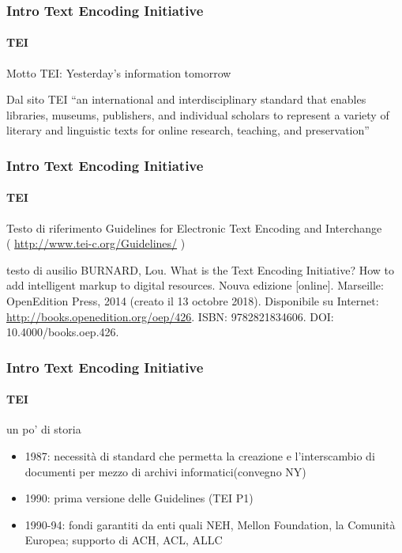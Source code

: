 

\begin{frame}
	\frametitle{Intro Text Encoding Initiative}
	\framesubtitle{TEI}
	\addtocounter{nframe}{1}

	\begin{block}{Motto}
		TEI: Yesterday's information tomorrow
	\end{block}

	\begin{block}{Dal sito TEI}
		“an international and interdisciplinary standard that
		enables libraries, museums, publishers, and individual
		scholars to represent a variety of literary and linguistic
		texts for online research, teaching, and preservation”
	\end{block}
\end{frame}


\begin{frame}
	\frametitle{Intro Text Encoding Initiative}
	\framesubtitle{TEI}
	\addtocounter{nframe}{1}

	\begin{block}{Testo di riferimento}
        Guidelines for Electronic Text Encoding and Interchange 
        \\( \url{http://www.tei-c.org/Guidelines/} )
	\end{block}

	\begin{block}{testo di ausilio}
		BURNARD, Lou. What is the Text Encoding Initiative? How to add intelligent markup to digital resources. Nouva edizione [online]. Marseille: OpenEdition Press, 2014 (creato il 13 octobre 2018). Disponibile su Internet: \url{http://books.openedition.org/oep/426}. ISBN: 9782821834606. DOI: 10.4000/books.oep.426.

	\end{block}
\end{frame}


\begin{frame}
	\frametitle{Intro Text Encoding Initiative}
	\framesubtitle{TEI}
	\addtocounter{nframe}{1}

	\begin{block}{un po' di storia}
		\begin{itemize}
			\item 1987: necessità di standard che permetta la creazione e l’interscambio di documenti per mezzo di archivi informatici(convegno NY)
			\item 1990: prima versione delle Guidelines (TEI P1)
			\item 1990-94: fondi garantiti da enti quali NEH, Mellon Foundation, la Comunità Europea; supporto di ACH, ACL, ALLC
		\end{itemize}
	\end{block}

\end{frame}

